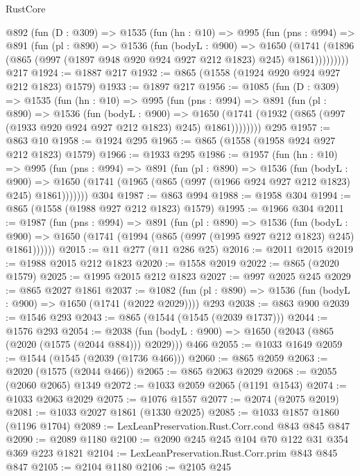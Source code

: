 \begin{lexlean}{RustCore}
\begin{coremodule}
    @892
      (fun (D : @309) =>
      @1535
        (fun (hn : @10) =>
        @995
          (fun (pns : @994) =>
          @891
            (fun (pl : @890) =>
            @1536
              (fun (bodyL : @900) =>
              @1650
                (@1741
                  (@1896 (@865 (@997 (@1897 @948 @920 @924 @927 @212 @1823) @245) @1861)))))))))
    @217
@1924 := @1887 @217
@1932 := @865 (@1558 (@1924 @920 @924 @927 @212 @1823) @1579)
@1933 := @1897 @217
@1956 := @1085
    (fun (D : @309) =>
    @1535
      (fun (hn : @10) =>
      @995
        (fun (pns : @994) =>
        @891
          (fun (pl : @890) =>
          @1536
            (fun (bodyL : @900) =>
            @1650 (@1741 (@1932 (@865 (@997 (@1933 @920 @924 @927 @212 @1823) @245) @1861))))))))
    @295
@1957 := @863 @10
@1958 := @1924 @295
@1965 := @865 (@1558 (@1958 @924 @927 @212 @1823) @1579)
@1966 := @1933 @295
@1986 := @1957
    (fun (hn : @10) =>
    @995
      (fun (pns : @994) =>
      @891
        (fun (pl : @890) =>
        @1536
          (fun (bodyL : @900) =>
          @1650 (@1741 (@1965 (@865 (@997 (@1966 @924 @927 @212 @1823) @245) @1861)))))))
    @304
@1987 := @863 @994
@1988 := @1958 @304
@1994 := @865 (@1558 (@1988 @927 @212 @1823) @1579)
@1995 := @1966 @304
@2011 := @1987
    (fun (pns : @994) =>
    @891
      (fun (pl : @890) =>
      @1536
        (fun (bodyL : @900) =>
        @1650 (@1741 (@1994 (@865 (@997 (@1995 @927 @212 @1823) @245) @1861))))))
@2015 := @11 @277 (@11 @286 @25)
@2016 := @2011 @2015
@2019 := @1988 @2015 @212 @1823
@2020 := @1558 @2019
@2022 := @865 (@2020 @1579)
@2025 := @1995 @2015 @212 @1823
@2027 := @997 @2025 @245
@2029 := @865 @2027 @1861
@2037 := @1082 (fun (pl : @890) => @1536 (fun (bodyL : @900) => @1650 (@1741 (@2022 @2029)))) @293
@2038 := @863 @900
@2039 := @1546 @293
@2043 := @865 (@1544 (@1545 (@2039 @1737)))
@2044 := @1576 @293
@2054 := @2038 (fun (bodyL : @900) => @1650 (@2043 (@865 (@2020 (@1575 (@2044 @884))) @2029))) @466
@2055 := @1033 @1649
@2059 := @1544 (@1545 (@2039 (@1736 @466)))
@2060 := @865 @2059
@2063 := @2020 (@1575 (@2044 @466))
@2065 := @865 @2063 @2029
@2068 := @2055 (@2060 @2065) @1349
@2072 := @1033 @2059 @2065 (@1191 @1543)
@2074 := @1033 @2063 @2029
@2075 := @1076 @1557
@2077 := @2074 (@2075 @2019)
@2081 := @1033 @2027 @1861 (@1330 @2025)
@2085 := @1033 @1857 @1860 (@1196 @1704)
@2089 := LexLeanPreservation.Rust.Corr.cond @843 @845 @847
@2090 := @2089 @1180
@2100 := @2090 @245 @245 @104 @70 @122 @31 @354 @369 @223 @1821
@2104 := LexLeanPreservation.Rust.Corr.prim @843 @845 @847
@2105 := @2104 @1180
@2106 := @2105 @245

\end{coremodule}
\end{lexlean}

